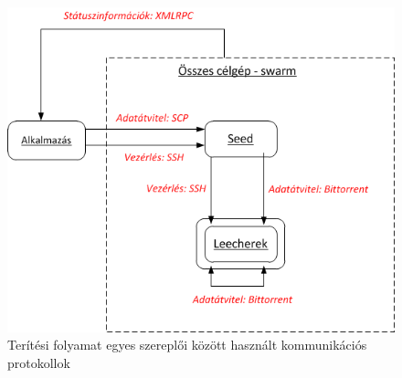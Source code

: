 \begin{figure}[ht]
	\centering
	\includegraphics[width=140mm, keepaspectratio]{figures/design_protocols.png}
	\caption{Terítési folyamat egyes szereplői között használt kommunikációs protokollok}
	\label{fig:designprotocols}
\end{figure}

